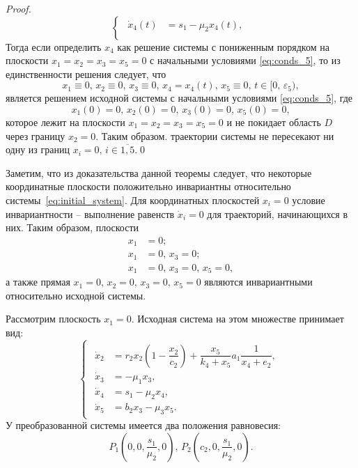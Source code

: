 \documentclass[14pt,a4paper]{extarticle}
\begin{document}
\begin{proof}
\begin{equation*}
\begin{cases}
\begin{aligned}
					\dot{x}_4(t) &= s_1-\mu_2x_4(t),\\
				\end{aligned}
			\end{cases}
		\end{equation*} 
		Тогда если определить $x_4$ как решение системы с пониженным порядком на плоскости $x_1=x_2=x_3=x_5=0$ с начальными условиями \ref{eq:conds_5}, то из единственности решения следует, что
		\[x_1\equiv0,\, x_2\equiv0,\, x_3\equiv0,\, x_4=x_4(t),\, x_5\equiv0,\, t\in[0,\,\varepsilon_5),\]
		является решением исходной системы с начальными условиями \ref{eq:conds_5}, где
		\[x_1(0)=0,\, x_2(0)=0,\, x_3(0)=0,\, x_5(0)=0,\]
		которое лежит на плоскости $x_1=x_2=x_3=x_5=0$ и не покидает область $D$ через границу $x_2=0$. Таким образом. траектории системы не пересекают ни одну из границ $x_i=0,\, i\in\overline{1,5}$.\qed
	\end{proof}
	
	Заметим, что из доказательства данной теоремы следует, что некоторые координатные плоскости положительно инвариантны относительно системы~\ref{eq:initial_system}. Для координатных плоскостей $x_i=0$ условие инвариантности -- выполнение равенств $\dot{x}_i=0$ для траекторий, начинающихся в них. Таким образом, плоскости  
	\begin{align*}
		x_1&=0;\\
		x_1&=0,\, x_3=0;\\
		x_1&=0,\, x_3=0,\, x_5=0,
	\end{align*}
	а также прямая $x_1=0,\, x_2=0,\, x_3=0,\, x_5=0$ являются инвариантными относительно исходной системы.  
	
	Рассмотрим плоскость $x_1=0$. Исходная система на этом множестве принимает вид:
	\begin{equation*}
		\begin{cases}
			\begin{aligned}
				\dot{x}_2 &= r_2x_2\left(1-\dfrac{x_2}{c_2}\right)+\dfrac{x_5}{k_4+x_5}a_1\dfrac{1}{x_4+e_2},\\
				\dot{x}_3 &= -\mu_1x_3,\\
				\dot{x}_4 &= s_1 - \mu_2x_4,\\
				\dot{x}_5 &= b_2x_3-\mu_3x_5.
			\end{aligned}
		\end{cases}
	\end{equation*}
	У преобразованной системы имеется два положения равновесия:
	\[P_1\left(0,0,\frac{s_1}{\mu_2},0\right),\, P_2\left(c_2,0,\frac{s_1}{\mu_2},0\right).\]
	
\end{document}
